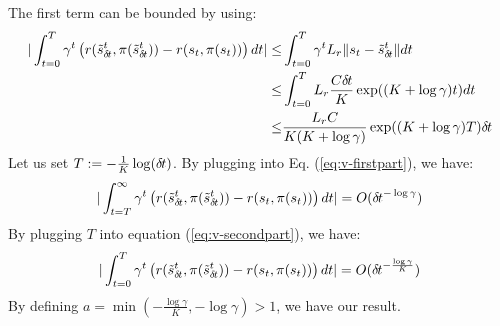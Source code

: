 The first term can be bounded by using: 
\begin{align}
  | \int_{t=0}^T\gamma^t \left(r(\tilde s_{\delta\hspace{-.1em}t}^t, \pi(\tilde s_{\delta\hspace{-.1em}t}^t)) - r(s_t, \pi(s_t)) \right)dt | \leq& \int_{t=0}^T\gamma^t L_r \| s_t - \tilde s_{\delta\hspace{-.1em}t}^t \| dt \\
  \leq& \int_{t=0}^T L_r \frac{C {\delta\hspace{-.1em}t}}{K} \exp((K + \log \gamma)t ) dt \\
  \leq&  \frac{L_r C}{K(K + \log \gamma)}\exp((K + \log \gamma)T ) {\delta\hspace{-.1em}t}
   \label{eq:v-secondpart}
\end{align}
Let us set $T \mathrel{\mathop{:}}= -\frac{1}{K}\log({\delta\hspace{-.1em}t})$. By plugging into Eq. (\ref{eq:v-firstpart}), we have:
\begin{align}
	| \int_{t=T}^\infty\gamma^t \left(r(\tilde s_{\delta\hspace{-.1em}t}^t, \pi(\tilde s_{\delta\hspace{-.1em}t}^t)) - r(s_t, \pi(s_t)) \right)dt | = O( {\delta\hspace{-.1em}t}^{-\log\gamma})
\end{align}
By plugging $T$ into equation (\ref{eq:v-secondpart}), we have:
\begin{align}
  | \int_{t=0}^T\gamma^t \left(r(\tilde s_{\delta\hspace{-.1em}t}^t, \pi(\tilde s_{\delta\hspace{-.1em}t}^t)) - r(s_t, \pi(s_t)) \right)dt | = O( {\delta\hspace{-.1em}t}^{-\frac{\log\gamma}{K}})
\end{align}
By defining $a = \min(-\frac{\log\gamma}{K}, -\log\gamma) > 1$, we have
our result. 

